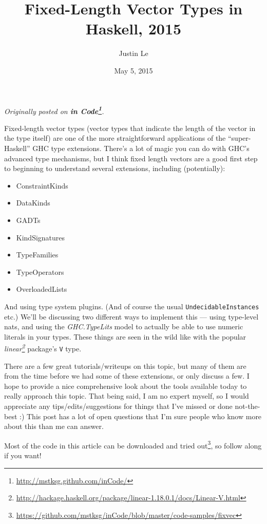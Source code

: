 \documentclass[]{article}
\title{Fixed-Length Vector Types in Haskell, 2015}
\author{Justin Le}
\date{May 5, 2015}
\renewcommand{\href}[2]{#2\footnote{\url{#1}}}
\begin{document}
\maketitle

\emph{Originally posted on
\textbf{\href{http://mstksg.github.com/inCode/}{in Code}}.}

Fixed-length vector types (vector types that indicate the length of the
vector in the type itself) are one of the more straightforward
applications of the ``super-Haskell'' GHC type extensions. There's a lot
of magic you can do with GHC's advanced type mechanisms, but I think
fixed length vectors are a good first step to beginning to understand
several extensions, including (potentially):

\begin{itemize}
\tightlist
\item
  ConstraintKinds
\item
  DataKinds
\item
  GADTs
\item
  KindSignatures
\item
  TypeFamilies
\item
  TypeOperators
\item
  OverloadedLists
\end{itemize}

And using type system plugins. (And of course the usual
\texttt{UndecidableInstances} etc.) We'll be discussing two different
ways to implement this --- using type-level nats, and using the
\emph{GHC.TypeLits} model to actually be able to use numeric literals in
your types. These things are seen in the wild like with the popular
\emph{\href{http://hackage.haskell.org/package/linear-1.18.0.1/docs/Linear-V.html}{linear}}
package's \texttt{V} type.

There are a few great tutorials/writeups on this topic, but many of them
are from the time before we had some of these extensions, or only
discuss a few. I hope to provide a nice comprehensive look about the
tools available today to really approach this topic. That being said, I
am no expert myself, so I would appreciate any tips/edits/suggestions
for things that I've missed or done not-the-best :) This post has a lot
of open questions that I'm sure people who know more about this than me
can answer.

Most of the code in this article can be
\href{https://github.com/mstksg/inCode/blob/master/code-samples/fixvec}{downloaded
and tried out}, so follow along if you want!
\end{document}
